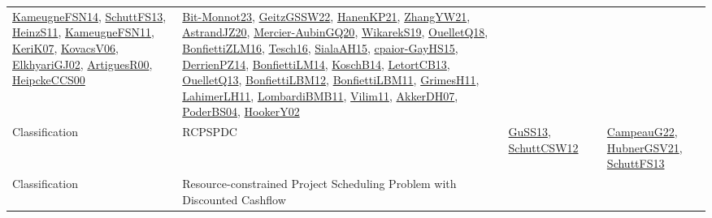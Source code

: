 {\begin{longtable}{lp{3cm}>{\raggedright}p{6cm}>{\raggedright}p{6cm}p{8cm}}
\href{articles/KameugneFSN14.pdf}{KameugneFSN14}\cite{KameugneFSN14}, \href{papers/SchuttFS13.pdf}{SchuttFS13}\cite{SchuttFS13}, \href{papers/HeinzS11.pdf}{HeinzS11}\cite{HeinzS11}, \href{papers/KameugneFSN11.pdf}{KameugneFSN11}\cite{KameugneFSN11}, \href{papers/KeriK07.pdf}{KeriK07}\cite{KeriK07}, \href{papers/KovacsV06.pdf}{KovacsV06}\cite{KovacsV06}, \href{papers/ElkhyariGJ02.pdf}{ElkhyariGJ02}\cite{ElkhyariGJ02}, \href{articles/ArtiguesR00.pdf}{ArtiguesR00}\cite{ArtiguesR00}, \href{articles/HeipckeCCS00.pdf}{HeipckeCCS00}\cite{HeipckeCCS00} & \href{papers/Bit-Monnot23.pdf}{Bit-Monnot23}\cite{Bit-Monnot23}, \href{papers/GeitzGSSW22.pdf}{GeitzGSSW22}\cite{GeitzGSSW22}, \href{papers/HanenKP21.pdf}{HanenKP21}\cite{HanenKP21}, \href{articles/ZhangYW21.pdf}{ZhangYW21}\cite{ZhangYW21}, \href{articles/AstrandJZ20.pdf}{AstrandJZ20}\cite{AstrandJZ20}, \href{papers/Mercier-AubinGQ20.pdf}{Mercier-AubinGQ20}\cite{Mercier-AubinGQ20}, \href{articles/WikarekS19.pdf}{WikarekS19}\cite{WikarekS19}, \href{papers/OuelletQ18.pdf}{OuelletQ18}\cite{OuelletQ18}, \href{papers/BonfiettiZLM16.pdf}{BonfiettiZLM16}\cite{BonfiettiZLM16}, \href{papers/Tesch16.pdf}{Tesch16}\cite{Tesch16}, \href{papers/SialaAH15.pdf}{SialaAH15}\cite{SialaAH15}, \href{papers/cpaior-GayHS15.pdf}{cpaior-GayHS15}\cite{cpaior-GayHS15}, \href{papers/DerrienPZ14.pdf}{DerrienPZ14}\cite{DerrienPZ14}, \href{papers/BonfiettiLM14.pdf}{BonfiettiLM14}\cite{BonfiettiLM14}, \href{papers/KoschB14.pdf}{KoschB14}\cite{KoschB14}, \href{papers/LetortCB13.pdf}{LetortCB13}\cite{LetortCB13}, \href{papers/OuelletQ13.pdf}{OuelletQ13}\cite{OuelletQ13}, \href{papers/BonfiettiLBM12.pdf}{BonfiettiLBM12}\cite{BonfiettiLBM12}, \href{papers/BonfiettiLBM11.pdf}{BonfiettiLBM11}\cite{BonfiettiLBM11}, \href{papers/GrimesH11.pdf}{GrimesH11}\cite{GrimesH11}, \href{papers/LahimerLH11.pdf}{LahimerLH11}\cite{LahimerLH11}, \href{papers/LombardiBMB11.pdf}{LombardiBMB11}\cite{LombardiBMB11}, \href{papers/Vilim11.pdf}{Vilim11}\cite{Vilim11}, \href{papers/AkkerDH07.pdf}{AkkerDH07}\cite{AkkerDH07}, \href{articles/PoderBS04.pdf}{PoderBS04}\cite{PoderBS04}, \href{papers/HookerY02.pdf}{HookerY02}\cite{HookerY02}\\
Classification & RCPSPDC & \href{papers/GuSS13.pdf}{GuSS13}\cite{GuSS13}, \href{papers/SchuttCSW12.pdf}{SchuttCSW12}\cite{SchuttCSW12} &  & \href{articles/CampeauG22.pdf}{CampeauG22}\cite{CampeauG22}, \href{articles/HubnerGSV21.pdf}{HubnerGSV21}\cite{HubnerGSV21}, \href{papers/SchuttFS13.pdf}{SchuttFS13}\cite{SchuttFS13}\\
Classification & Resource-constrained Project Scheduling Problem with Discounted Cashflow &  &  & \\

\end{longtable}}
